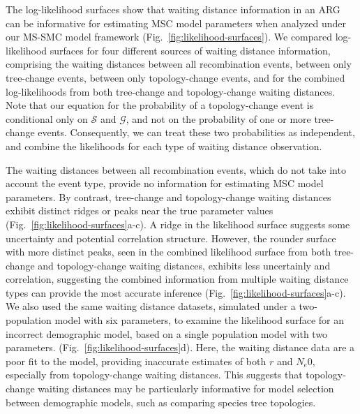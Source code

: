 \documentclass[11pt]{article}
\begin{document}
The log-likelihood surfaces show that waiting distance information
in an ARG can be informative for estimating MSC model parameters 
when analyzed under our MS-SMC model framework
(Fig.~\ref{fig:likelihood-surfaces}). 
We compared log-likelihood surfaces for four different sources of waiting
distance information, comprising the waiting distances between all 
recombination events, between only tree-change events, between only 
topology-change events, and for the combined log-likelihoods from both 
tree-change and topology-change waiting distances. 
Note that our equation for the probability of a topology-change event is
conditional only on $\mathcal{S}$ and $\mathcal{G}$, and not on
the probability of one or more tree-change events. 
Consequently, we can treat these two probabilities as independent, and 
combine the likelihoods for each type of waiting distance observation.

The waiting distances between all recombination events, which do not take into
account the event type, provide no information for estimating MSC model 
parameters. By contrast, tree-change and topology-change waiting distances 
exhibit distinct ridges or peaks near the true parameter values
(Fig.~\ref{fig:likelihood-surfaces}a-c).
A ridge in the likelihood surface suggests some uncertainty and potential
correlation structure. However, the rounder surface with more distinct peaks,
seen in the combined likelihood surface from both tree-change and 
topology-change waiting distances, exhibits less uncertainly and 
correlation, suggesting the combined information from multiple waiting distance
types can provide the most accurate inference
(Fig.~\ref{fig:likelihood-surfaces}a-c).
We also used the same waiting distance datasets, simulated under a two-population
model with six parameters, to examine the likelihood surface for an incorrect 
demographic model, based on a single population model with two parameters.
(Fig.~\ref{fig:likelihood-surfaces}d). 
Here, the waiting distance data are a poor fit to the model, providing
inaccurate estimates of both $r$ and $N_e$0, especially from topology-change 
waiting distances. This suggests that topology-change waiting distances may be
particularly informative for model selection between demographic models, 
such as comparing species tree topologies.
\end{document}
